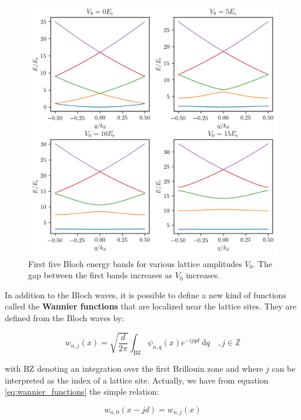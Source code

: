 \begin{figure}
    \centering
    \includegraphics[width=\textwidth]{Fig/Chapter2/bloch_bands.png}
    \caption{First five Bloch energy bands for various lattice amplitudes $V_0$. The gap between the first bands increases as $V_0$ increases.}
    \label{fig:bloch_bands}
\end{figure}

In addition to the Bloch waves, it is possible to define a new kind of functions called the\textbf{ Wannier functions} \cite{wannier1937structure} that are localized near the lattice sites. They are defined from the Bloch waves by:

\begin{equation}
    w_{n, j}(x)=\sqrt{\frac{d}{2 \pi}} \int_{\mathrm{BZ}} \psi_{n, q}(x) e^{-i j q d} \mathrm{~d} q \quad, j \in \mathbb{Z}
    \label{eq:wannier_functions}
\end{equation}

\noindent with BZ denoting an integration over the first Brillouin zone and where $j$ can be interpreted as the index of a lattice site. Actually, we have from equation \ref{eq:wannier_functions} the simple relation:

\begin{equation}
    w_{n, 0}(x-j d)=w_{n, j}(x)
\end{equation}

